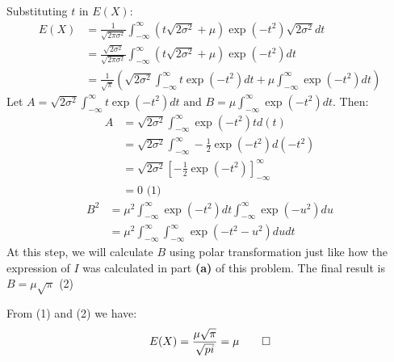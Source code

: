 \documentclass[a4paper, 10pt]{article}  %
\begin{document}
\begin{enumerate}[label=\textbf{(\alph*)}]
    Substituting $t$ in $E(X)$:
    \begin{align*}
        E(X) &= \frac{1}{\sqrt{2 \pi \sigma^2}} \int_{-\infty}^\infty (t\sqrt{2 \sigma^2} + \mu) \exp (-t^2) \sqrt{2 \sigma^2} dt \\
        &= \frac{\sqrt{2 \sigma^2}}{\sqrt{2 \pi \sigma^2}} \int_{-\infty}^\infty (t\sqrt{2 \sigma^2} + \mu) \exp (-t^2) dt \\
        &= \frac{1}{\sqrt{\pi}} \left( \sqrt{2 \sigma^2} \int_{-\infty}^\infty t \exp(-t^2) dt + \mu \int_{-\infty}^\infty \exp(-t^2) dt \right)
    \end{align*}
    Let \(\displaystyle{A = \sqrt{2 \sigma^2} \int_{-\infty}^\infty t \exp(-t^2) dt \text{ and } B = \mu \int_{-\infty}^\infty \exp(-t^2) dt}\). Then:
    \begin{align*}
    A &= \sqrt{2 \sigma^2} \int_{-\infty}^\infty \exp(-t^2) t d(t) \\
    &= \sqrt{2 \sigma^2} \int_{-\infty}^\infty -\frac{1}{2} \exp(-t^2) d(-t^2) \\
    &= \sqrt{2 \sigma^2} \left[ -\frac{1}{2} \exp(-t^2)\right]_{-\infty}^\infty \\
    &= 0 \text{     (1)}
    \end{align*}
    \begin{align*}
        B^2 &=  \mu^2 \int_{-\infty}^\infty \exp(-t^2) dt \int_{-\infty}^\infty \exp(-u^2) du \\
        &= \mu^2 \int_{-\infty}^\infty \int_{-\infty}^\infty \exp (-t^2 - u^2) du dt
    \end{align*}
    At this step, we will calculate $B$ using polar transformation just like how the expression of $I$ was calculated in part \textbf{(a)} of this problem. The final result is $B = \mu \sqrt{\pi}$  (2)
    
    From (1) and (2) we have:
    \[E(X) = \frac{\mu \sqrt{\pi}}{\sqrt{pi}} = \mu  \qed\]
    

\end{enumerate}
\end{document}
